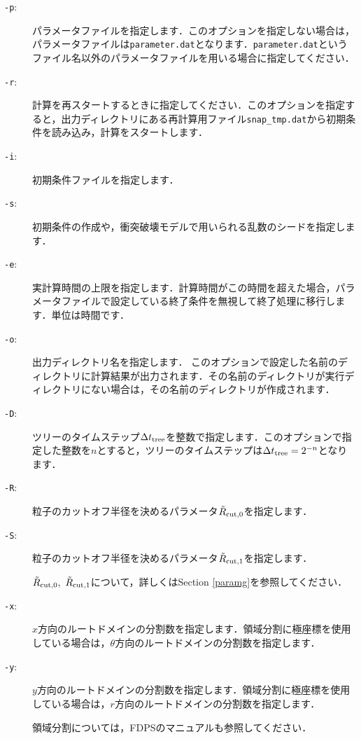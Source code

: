 \documentclass[12pt,a4paper,dvipdfmx]{jsarticle}
\begin{document}
\begin{description}
\item[\texttt{-p}:]
パラメータファイルを指定します．このオプションを指定しない場合は，パラメータファイルは\texttt{parameter.dat}となります．\texttt{parameter.dat}というファイル名以外のパラメータファイルを用いる場合に指定してください．
\item[\texttt{-r}:]
計算を再スタートするときに指定してください．このオプションを指定すると，出力ディレクトリにある再計算用ファイル\texttt{snap\_tmp.dat}から初期条件を読み込み，計算をスタートします．
\item[\texttt{-i}:]
初期条件ファイルを指定します．
\item[\texttt{-s}:]
初期条件の作成や，衝突破壊モデルで用いられる乱数のシードを指定します．
\item[\texttt{-e}:]
実計算時間の上限を指定します．計算時間がこの時間を超えた場合，パラメータファイルで設定している終了条件を無視して終了処理に移行します．単位は時間です．
\item[\texttt{-o}:]
出力ディレクトリ名を指定します．
このオプションで設定した名前のディレクトリに計算結果が出力されます．その名前のディレクトリが実行ディレクトリにない場合は，その名前のディレクトリが作成されます．
\item[\texttt{-D}:]
ツリーのタイムステップ$\Delta t_{\rm tree}$を整数で指定します．このオプションで指定した整数を$n$とすると，ツリーのタイムステップは$\Delta t_{\rm tree}=2^{-n}$となります．
\item[\texttt{-R}:]
粒子のカットオフ半径を決めるパラメータ$\tilde{R}_{\rm cut,0}$を指定します．
\item[\texttt{-S}:]
粒子のカットオフ半径を決めるパラメータ$\tilde{R}_{\rm cut,1}$を指定します．

$\tilde{R}_{\rm cut,0},\ \tilde{R}_{\rm cut,1}$について，詳しくはSection \ref{paramg}を参照してください．
\item[\texttt{-x}:]
$x$方向のルートドメインの分割数を指定します．領域分割に極座標を使用している場合は，$\theta$方向のルートドメインの分割数を指定します．
\item[\texttt{-y}:]
$y$方向のルートドメインの分割数を指定します．領域分割に極座標を使用している場合は，$r$方向のルートドメインの分割数を指定します．

領域分割については，FDPSのマニュアルも参照してください．


\end{description}
\end{document}
